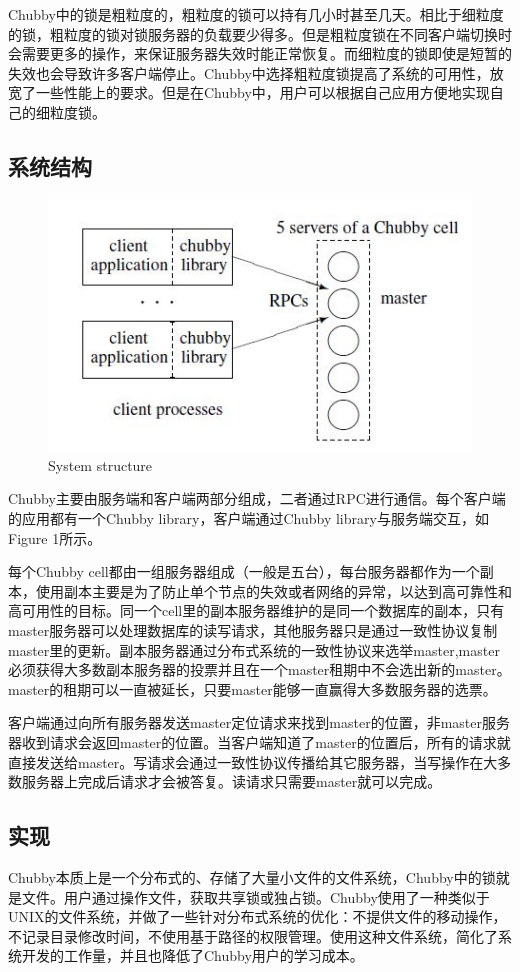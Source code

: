 \documentclass[UTF8]{article}
\begin{document}
\indent Chubby中的锁是粗粒度的，粗粒度的锁可以持有几小时甚至几天。相比于细粒度的锁，粗粒度的锁对锁服务器的负载要少得多。但是粗粒度锁在不同客户端切换时会需要更多的操作，来保证服务器失效时能正常恢复。而细粒度的锁即使是短暂的失效也会导致许多客户端停止。Chubby中选择粗粒度锁提高了系统的可用性，放宽了一些性能上的要求。但是在Chubby中，用户可以根据自己应用方便地实现自己的细粒度锁。
	\subsection{系统结构}

\begin{figure}[htbp]
\centering
\small
\includegraphics{1.JPG}
\caption{System structure}
\end{figure}
	Chubby主要由服务端和客户端两部分组成，二者通过RPC进行通信。每个客户端的应用都有一个Chubby library，客户端通过Chubby library与服务端交互，如Figure 1所示。
	
	每个Chubby cell都由一组服务器组成（一般是五台），每台服务器都作为一个副本，使用副本主要是为了防止单个节点的失效或者网络的异常，以达到高可靠性和高可用性的目标。同一个cell里的副本服务器维护的是同一个数据库的副本，只有master服务器可以处理数据库的读写请求，其他服务器只是通过一致性协议复制master里的更新。副本服务器通过分布式系统的一致性协议来选举master,master必须获得大多数副本服务器的投票并且在一个master租期中不会选出新的master。master的租期可以一直被延长，只要master能够一直赢得大多数服务器的选票。

	客户端通过向所有服务器发送master定位请求来找到master的位置，非master服务器收到请求会返回master的位置。当客户端知道了master的位置后，所有的请求就直接发送给master。写请求会通过一致性协议传播给其它服务器，当写操作在大多数服务器上完成后请求才会被答复。读请求只需要master就可以完成。

\subsection{实现}
	Chubby本质上是一个分布式的、存储了大量小文件的文件系统，Chubby中的锁就是文件。用户通过操作文件，获取共享锁或独占锁。Chubby使用了一种类似于UNIX的文件系统，并做了一些针对分布式系统的优化：不提供文件的移动操作，不记录目录修改时间，不使用基于路径的权限管理。使用这种文件系统，简化了系统开发的工作量，并且也降低了Chubby用户的学习成本。
\end{document}
